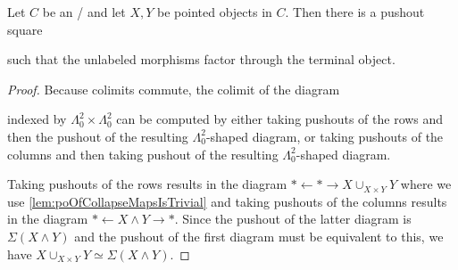 \begin{lemma}\label{lem:poSqWithFactoringTerminal}
    Let $C$ be an \inftytop/ and let $X,Y$ be pointed objects in $C$. 
    Then there is a pushout square
    \begin{center}
    \end{center}
    such that the unlabeled morphisms factor through the terminal object.
    \begin{proof}
        Because colimits commute, the colimit of the diagram 
        \begin{center}
        \end{center}
        indexed by $\Lambda_0^2\times\Lambda_0^2$ can be computed by either taking pushouts of the rows and then the pushout of the resulting $\Lambda_0^2$-shaped diagram, or taking pushouts of the columns and then taking pushout of the resulting $\Lambda_0^2$-shaped diagram.
        
        Taking pushouts of the rows results in the diagram $*\xleftarrow{}*\rightarrow X\cup_{X\times Y} Y$ where we use \cref{lem:poOfCollapseMapsIsTrivial} and taking pushouts of the columns results in the diagram $*\xleftarrow{}X\wedge Y\rightarrow *$. 
        Since the pushout of the latter diagram is $\Sigma\left(X\wedge Y\right)$ and the pushout of the first diagram must be equivalent to this, we have $X\cup_{X\times Y} Y\simeq\Sigma\left(X\wedge Y\right)$.
        

\end{proof}
\end{lemma}
